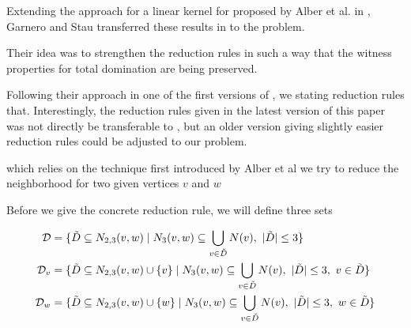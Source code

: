
Extending the approach for a linear kernel for \dom proposed by Alber et al. in \cite{Alber2004}, Garnero and Stau transferred these results in \cite{Garnero2018} to the \tdom problem. 

Their idea was to strengthen the reduction rules in such a way that the witness properties for total domination are being preserved.

Following their approach in one of the first versions of \cite{Garnero2014}, we stating reduction rules that. Interestingly, the reduction rules given in the latest version of this paper was not directly be transferable to \sdom, but an older version giving slightly easier reduction rules could be adjusted to our problem.

which relies on the technique first introduced by Alber et al we try to reduce the neighborhood for two given vertices $v$ and $w$

Before we give the concrete reduction rule, we will define three sets 

\begin{align}
    \mathcal{D} &= \{ \tilde D \subseteq N_{2,3}(v,w)            \mid N_3(v,w) \subseteq \bigcup_{v \in \tilde D} N(v),\ |\tilde D| \leq 3                  \}\\
    \mathcal{D}_{v}  &= \{ \tilde D \subseteq N_{2,3}(v,w) \cup \{v\} \mid N_3(v,w) \subseteq \bigcup_{v \in \tilde D} N(v),\ |\tilde D| \leq 3,\ v \in \tilde D \}\\
    \mathcal{D}_{w}  &= \{ \tilde D \subseteq N_{2,3}(v,w) \cup \{w\} \mid N_3(v,w) \subseteq \bigcup_{v \in \tilde D} N(v),\ |\tilde D| \leq 3,\ w \in \tilde D \}
    \end{align}


